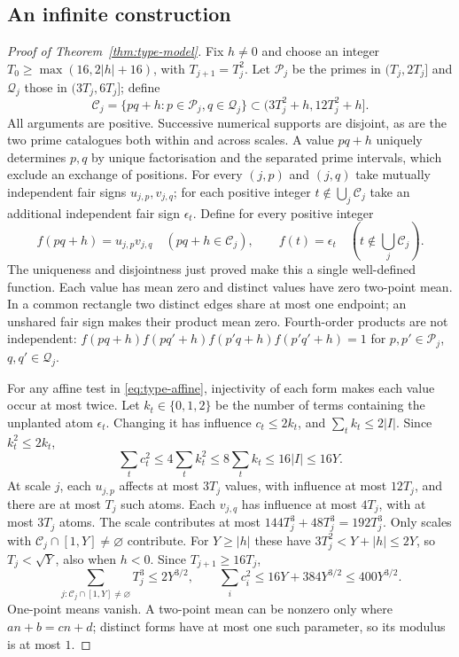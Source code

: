 \documentclass[11pt]{article}
\theoremstyle{definition}
\theoremstyle{remark}
\numberwithin{equation}{section}
\begin{document}
\subsection{An infinite construction}
\begin{proof}[Proof of Theorem~\ref{thm:type-model}]
Fix $h\ne0$ and choose an integer $T_0\ge\max(16,2|h|+16)$, with $T_{j+1}=T_j^2$.
Let $\mathcal P_j$ be the primes in $(T_j,2T_j]$ and $\mathcal Q_j$ those in $(3T_j,6T_j]$;
define
\begin{equation}\label{eq:c-core}
 \mathcal C_j=\{pq+h:p\in\mathcal P_j,q\in\mathcal Q_j\}
 \subset(3T_j^2+h,12T_j^2+h].
\end{equation}
All arguments are positive. Successive numerical supports are disjoint, as are the two prime
catalogues both within and across scales. A value $pq+h$ uniquely determines $p,q$ by unique
factorisation and the separated prime intervals, which exclude an exchange of positions.
For every $(j,p)$ and $(j,q)$ take mutually independent fair signs $u_{j,p},v_{j,q}$;
for each positive integer $t\notin\bigcup_j\mathcal C_j$ take an additional independent fair sign
$\epsilon_t$. Define for every positive integer
\begin{equation}\label{eq:c-definition}
 f(pq+h)=u_{j,p}v_{j,q}\quad(pq+h\in\mathcal C_j),\qquad
 f(t)=\epsilon_t\quad(t\notin\bigcup_j\mathcal C_j).
\end{equation}
The uniqueness and disjointness just proved make this a single well-defined function.
Each value has mean zero and distinct values have zero two-point mean. In a common rectangle two distinct
edges share at most one endpoint; an unshared fair sign makes their product mean zero. Fourth-order
products are not independent: $f(pq+h)f(pq'+h)f(p'q+h)f(p'q'+h)=1$ for $p,p'\in\mathcal P_j$, $q,q'\in\mathcal Q_j$.

For any affine test in \eqref{eq:type-affine}, injectivity of each form makes each value occur at most
twice. Let $k_t\in\{0,1,2\}$ be the number of terms containing the unplanted atom $\epsilon_t$.
Changing it has influence $c_t\le2k_t$, and $\sum_tk_t\le2|I|$.
Since $k_t^2\le2k_t$,
\begin{equation}\label{eq:c-unplanted-influence}
 \sum_t c_t^2\le4\sum_tk_t^2\le8\sum_tk_t\le16|I|\le16Y.
\end{equation}
At scale $j$, each $u_{j,p}$ affects at most $3T_j$ values, with influence
at most $12T_j$, and there are at most $T_j$ such atoms. Each $v_{j,q}$ has influence at most $4T_j$,
with at most $3T_j$ atoms. The scale contributes at most
$144T_j^3+48T_j^3=192T_j^3$.
Only scales with $\mathcal C_j\cap[1,Y]\ne\varnothing$ contribute. For $Y\ge|h|$ these have
$3T_j^2<Y+|h|\le2Y$, so $T_j<\sqrt Y$, also when $h<0$.
Since $T_{j+1}\ge16T_j$,
\begin{equation}\label{eq:c-influences}
 \sum_{j:\mathcal C_j\cap[1,Y]\ne\varnothing}T_j^3\le2Y^{3/2},\qquad
 \sum_i c_i^2\le16Y+384Y^{3/2}\le400Y^{3/2}.
\end{equation}
One-point means vanish. A two-point mean can be nonzero only where $an+b=cn+d$; distinct forms
have at most one such parameter, so its modulus is at most $1$.


\end{proof}
\end{document}
